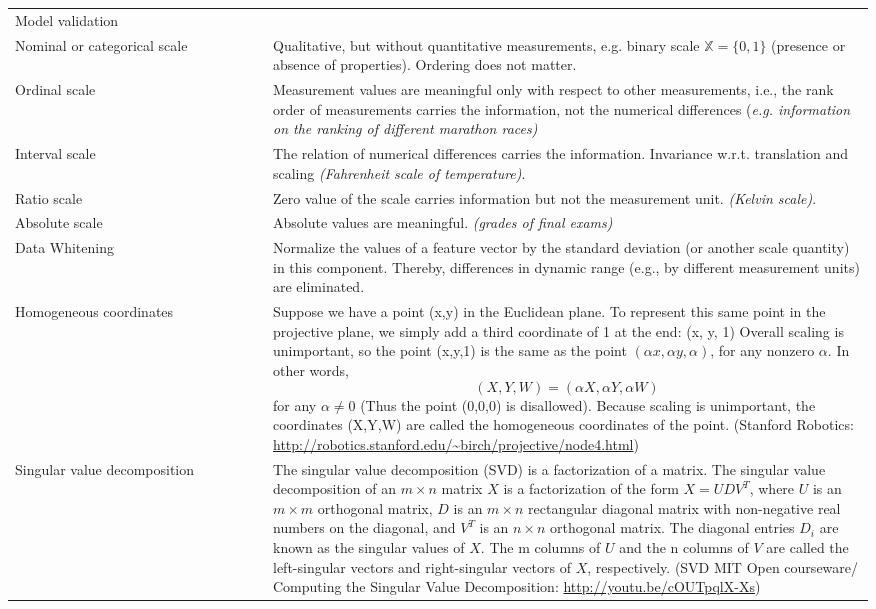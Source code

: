 \documentclass[MachineLearning]{subfiles}
\begin{document}
\begin{longtable}{p{0.3\linewidth} p{0.7\linewidth}}
Model validation & \\
Nominal or categorical scale & Qualitative, but without quantitative measurements,
e.g. binary scale \(\mathbb{X} = \{0, 1\}\) (presence or absence of
properties). Ordering does not matter.\\
Ordinal scale & Measurement values are meaningful only with respect to other measurements, i.e., the rank order of measurements carries
the information, not the numerical differences {\color{orange}(\emph{e.g. information on the ranking of different marathon races)}}\\
Interval scale &  The relation of numerical differences carries
the information. Invariance w.r.t. translation and scaling {\color{orange}\emph{(Fahrenheit scale of temperature)}}.\\
Ratio scale & Zero value of the scale carries information but not the measurement unit. {\color{orange}\emph{(Kelvin scale)}}.\\
Absolute scale & Absolute values are meaningful. {\color{orange}\emph{(grades of final exams)}}\\
Data Whitening & Normalize the values of a feature vector by the standard deviation (or another scale quantity) in this component. Thereby, differences in dynamic range (e.g., by different measurement units) are eliminated.\\
Homogeneous coordinates \label{homogeneous-coordinates@Glossary} & Suppose we have a point (x,y) in the Euclidean plane. To represent this same point in the projective plane, we simply add a third coordinate of 1 at the end: (x, y, 1) Overall scaling is unimportant, so the point (x,y,1) is the same as the point  \((\alpha x, \alpha y, \alpha)\), for any nonzero \(\alpha\). In other words, 
\[(X,Y,W) = (\alpha X, \alpha Y, \alpha W)\]
for any  $\alpha \neq 0$ (Thus the point (0,0,0) is disallowed). Because scaling is unimportant, the coordinates (X,Y,W) are called the homogeneous coordinates of the point. (Stanford Robotics: \url{http://robotics.stanford.edu/~birch/projective/node4.html})\\

Singular value decomposition \label{SVD@Glossary} &  The singular value decomposition (SVD) is a factorization of a matrix. The singular value decomposition of an \(m \times n\) matrix \(X\) is a factorization of the form \(X = UDV^T\), where \(U\) is an \(m \times m\) orthogonal matrix, \(D\) is an \(m \times n\) rectangular diagonal matrix with non-negative real numbers on the diagonal, and \(V^T\) is an \(n \times n\) orthogonal matrix. The diagonal entries \(D_i\) are known as the singular values of \(X\). The m columns of \(U\) and the n columns of \(V\) are called the left-singular vectors and right-singular vectors of \(X\), respectively. (SVD MIT Open courseware/ Computing the Singular Value Decomposition: \url{http://youtu.be/cOUTpqlX-Xs})
\end{longtable}
\end{document}
